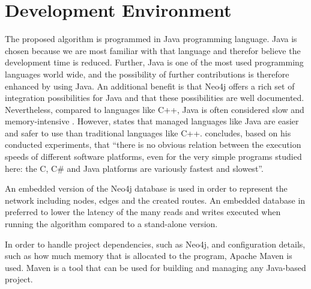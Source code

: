 \section{Development Environment}

The proposed algorithm is programmed in Java programming language. Java is chosen because we are most familiar with that language and therefor believe the development time is reduced. Further, Java is one of the most used programming languages world wide, and the possibility of further contributions is therefore enhanced by using Java. An additional benefit is that Neo4j offers a rich set of integration possibilities for Java and that these possibilities are well documented. Nevertheless, compared to languages like C++, Java is often considered slow and memory-intensive \citep{alnaser12}. However, \citet{sestoft10} states that managed languages like Java are easier and safer to use than traditional languages like C++. \citet{sestoft10} concludes, based on his conducted experiments, that ``there is no obvious relation between the execution speeds of different software platforms, even for the very simple programs studied here: the C, C\# and Java platforms are variously fastest and slowest''.

An embedded version of the Neo4j database is used in order to represent the network including nodes, edges and the created routes. An embedded database in preferred to lower the latency of the many reads and writes executed when running the algorithm compared to a stand-alone version. 

In order to handle project dependencies, such as Neo4j, and configuration details, such as how much memory that is allocated to the program, Apache Maven\citep{website:maven} is used. Maven is a tool that can be used for building and managing any Java-based project. 